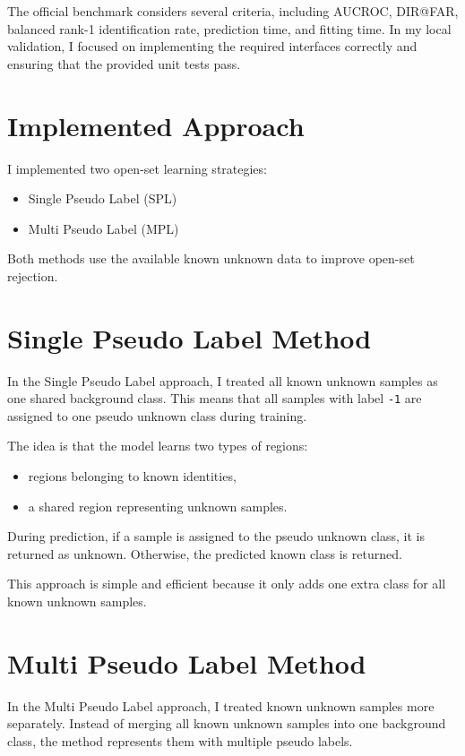 \documentclass[11pt,a4paper]{article}
\begin{document}
The official benchmark considers several criteria, including AUCROC, DIR@FAR, balanced rank-1 identification rate, prediction time, and fitting time. In my local validation, I focused on implementing the required interfaces correctly and ensuring that the provided unit tests pass.

\section{Implemented Approach}

I implemented two open-set learning strategies:

\begin{itemize}[noitemsep]
    \item Single Pseudo Label (SPL)
    \item Multi Pseudo Label (MPL)
\end{itemize}

Both methods use the available known unknown data to improve open-set rejection.

\section{Single Pseudo Label Method}

In the Single Pseudo Label approach, I treated all known unknown samples as one shared background class. This means that all samples with label \texttt{-1} are assigned to one pseudo unknown class during training.

The idea is that the model learns two types of regions:

\begin{itemize}[noitemsep]
    \item regions belonging to known identities,
    \item a shared region representing unknown samples.
\end{itemize}

During prediction, if a sample is assigned to the pseudo unknown class, it is returned as unknown. Otherwise, the predicted known class is returned.

This approach is simple and efficient because it only adds one extra class for all known unknown samples.

\section{Multi Pseudo Label Method}

In the Multi Pseudo Label approach, I treated known unknown samples more separately. Instead of merging all known unknown samples into one background class, the method represents them with multiple pseudo labels.
\end{document}
